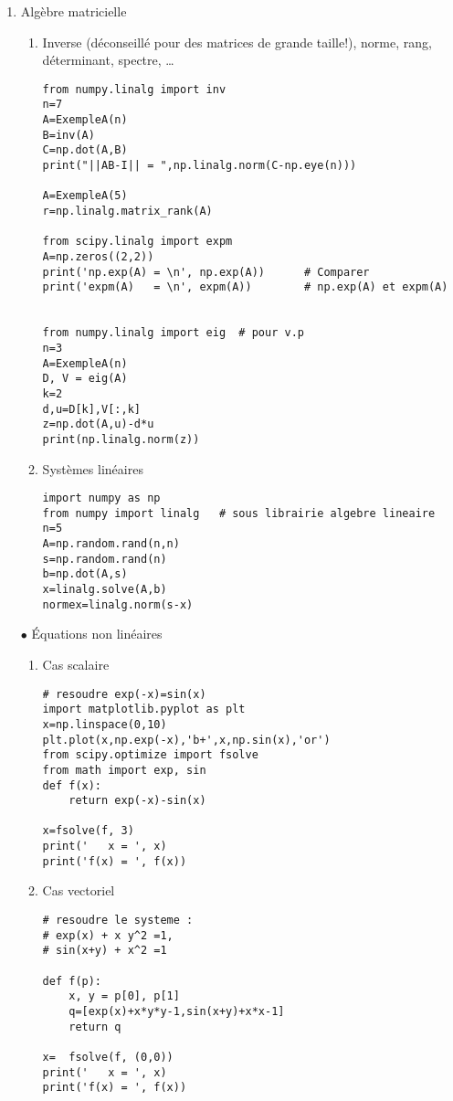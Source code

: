 \documentclass[12pt]{article}
\begin{document}
\begin{enumerate}
 \item  Alg\`ebre matricielle
 
 \begin{enumerate}
 \item  Inverse (d\'econseillé pour des matrices de grande taille!), 
norme, rang, d\'eterminant, spectre, \ldots 

\begin{lstlisting}
from numpy.linalg import inv
n=7
A=ExempleA(n)
B=inv(A)
C=np.dot(A,B)
print("||AB-I|| = ",np.linalg.norm(C-np.eye(n))) 

A=ExempleA(5)
r=np.linalg.matrix_rank(A)

from scipy.linalg import expm
A=np.zeros((2,2))
print('np.exp(A) = \n', np.exp(A))      # Comparer
print('expm(A)   = \n', expm(A))        # np.exp(A) et expm(A)


from numpy.linalg import eig  # pour v.p 
n=3
A=ExempleA(n)
D, V = eig(A)
k=2
d,u=D[k],V[:,k]
z=np.dot(A,u)-d*u
print(np.linalg.norm(z))
\end{lstlisting}
 
 \item  Syst\`emes lin\'eaires 
  
\begin{lstlisting}
import numpy as np
from numpy import linalg   # sous librairie algebre lineaire
n=5
A=np.random.rand(n,n)
s=np.random.rand(n)
b=np.dot(A,s)
x=linalg.solve(A,b)
normex=linalg.norm(s-x) 
\end{lstlisting} 
 \end{enumerate}
 

 \item[$\bullet$] \'Equations non lin\'eaires
 \begin{enumerate}
 \item Cas scalaire
 
\begin{lstlisting}
# resoudre exp(-x)=sin(x) 
import matplotlib.pyplot as plt
x=np.linspace(0,10)
plt.plot(x,np.exp(-x),'b+',x,np.sin(x),'or')
from scipy.optimize import fsolve
from math import exp, sin 
def f(x):
    return exp(-x)-sin(x)

x=fsolve(f, 3)
print('   x = ', x) 
print('f(x) = ', f(x)) 
\end{lstlisting} 

 \item Cas vectoriel 
 
\begin{lstlisting}
# resoudre le systeme : 
# exp(x) + x y^2 =1, 
# sin(x+y) + x^2 =1

def f(p):
    x, y = p[0], p[1]
    q=[exp(x)+x*y*y-1,sin(x+y)+x*x-1]
    return q

x=  fsolve(f, (0,0))
print('   x = ', x) 
print('f(x) = ', f(x)) 
\end{lstlisting} 
\end{enumerate}
\end{enumerate}
\end{document}
